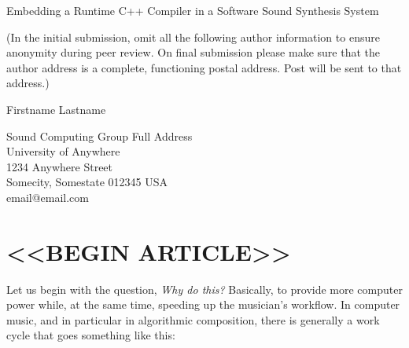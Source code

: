 \documentclass[letterpaper, 12pt]{article}
\begin{document}
{\cmjTitle Embedding a Runtime C++ Compiler in a Software Sound Synthesis System}
\vspace*{24pt}

(In the initial submission, omit all the following author information to ensure anonymity during peer review.
On final submission please make sure that the author address is a complete, functioning postal address.
Post will be sent to that address.)

{\cmjAuthor Firstname Lastname}	%
 
\begin{cmjAuthorAddress}
	Sound Computing Group Full Address\\
	University of Anywhere\\
	1234 Anywhere Street\\
	Somecity, Somestate 012345 USA\\		%
	email@email.com
\end{cmjAuthorAddress}


\begin{abstract}
	This article considers why musicians and researchers might want to use a C++ compiler embedded in a software synthesis (SWSS) system, and how such a compiler can be implemented and used, by presenting new opcodes for the Csound SWSS that embed the Clang/LLVM on-request compiler (ORC). C++ source code may be embedded in a regular Csound orchestra file, compiled by the \texttt{clang\_compile} opcode, and invoked during performance by the \texttt{clang\_invoke} opcode. Uses include writing new signal processing and synthesis code in C++ right in the SWSS, full-strength algorithmic composition right in the SWSS, calling into external dynamic link libraries right from the SWSS, creating native user interfaces for a piece right in the SWSS, and more. The technology and patterns presented here could be adapted for use in any SWSS that supports the C calling convention. 
\end{abstract}

\section{<<BEGIN ARTICLE>>}

Let us begin with the question, \textit{Why do this?} Basically, to provide more computer power while, at the same time, speeding up the musician's workflow. In computer music, and in particular in algorithmic composition, there is generally a work cycle that goes something like this:
\end{document}
